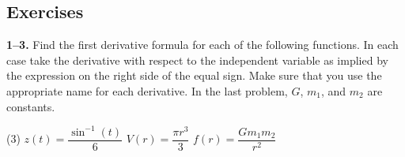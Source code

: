 \documentclass[10pt,oneside,]{book}
\theoremstyle{plain}
\theoremstyle{definition}
\numberwithin{equation}{section}
\newcommand{\fe}[2]{#1\mathopen{}\left(#2\right)\mathclose{}}
\begin{document}
\subsection[Exercises]{Exercises}\label{exercises-35}
\textbf{1--3. }\hypertarget{exercisegroup-74}{\null}Find the first derivative formula for each of the following functions.  In each case take the derivative with respect to the independent variable as implied by the expression on the right side of the equal sign.  Make sure that you use the appropriate name for each derivative. In the last problem, \(G\), \(m_1\), and \(m_2\) are constants.%
\par
\begin{exercisegroup}(3)
\exercise[1.]\hypertarget{exercise-364}{\null}\(\fe{z}{t}=\dfrac{\fe{\sin^{-1}}{t}}{6}\)%
\exercise[2.]\hypertarget{exercise-365}{\null}\(\fe{V}{r}=\dfrac{\pi r^3}{3}\)%
\exercise[3.]\hypertarget{exercise-366}{\null}\(\fe{f}{r}=\dfrac{Gm_1m_2}{r^2}\)%
\end{exercisegroup}
\par\smallskip\noindent
\typeout{************************************************}
\typeout{************************************************}
\end{document}

